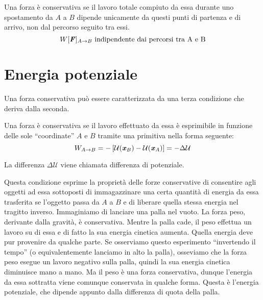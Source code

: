 \vspace{8pt}
\begin{tcolorbox}[colback = red!30, colframe = red!30!black, title = {Forza conservativa (condizione II)}]
    Una forza è conservativa se il lavoro totale compiuto da essa durante uno spostamento
    da $A$ a $B$ dipende unicamente da questi punti di partenza e di arrivo, non
    dal percorso seguito tra essi.
    \[ W[\textbf{\textit{F}}]_{A\to B} \text{ indipendente dai percorsi tra A e B} \]
\end{tcolorbox}
\vspace{5pt}

\section{Energia potenziale}
Una forza conservativa può essere caratterizzata da una terza condizione che deriva
dalla seconda.

\vspace{8pt}
\begin{tcolorbox}[colback = red!30, colframe = red!30!black, title = {Forza conservativa (condizione III)}]
    Una forza è conservativa se il lavoro effettuato da essa è esprimibile in
    funzione delle sole ``coordinate'' $A$ e $B$ tramite una primitiva nella forma
    seguente:
    \[ W_{A\to B} = -\left[\mathcal{U}(\textbf{\textit{x}}_B) - \mathcal{U}(\textbf{\textit{x}}_A)\right] = -\Delta\mathcal{U} \]
\end{tcolorbox}
\vspace{5pt}

\noindent La differenza $\Delta\mathcal{U}$ viene chiamata differenza
di potenziale.

Questa condizione esprime la proprietà delle forze conservative di
consentire agli oggetti ad essa sottoposti di immagazzinare una certa quantità
di energia da essa trasferita se l'oggetto passa da $A$ a $B$ e di liberare
quella stessa energia nel tragitto inverso. Immaginiamo di lanciare una palla
nel vuoto. La forza peso, derivante dalla gravità, è conservativa. Mentre la
palla cade, il peso effettua un lavoro su di essa e di fatto la sua energia
cinetica aumenta. Quella energia deve pur provenire da qualche parte. Se osserviamo
questo esperimento ``invertendo il tempo'' (o equivalentemente lanciamo in alto
la palla), osseviamo che la forza peso esegue un lavoro negativo sulla palla,
quindi la sua energia cinetica diminuisce mano a mano. Ma il peso è una forza
conservativa, dunque l'energia da essa sottratta viene comunque conservata
in qualche forma. Questa è l'energia potenziale, che dipende appunto dalla differenza
di quota della palla.

